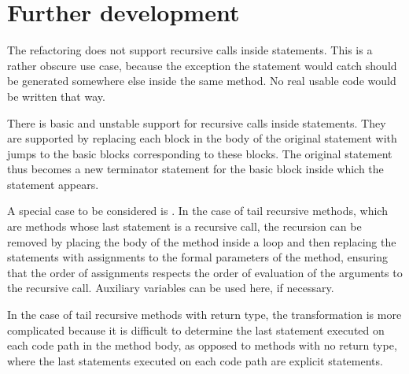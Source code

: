 \chapter{Further development}


The refactoring does not support recursive calls inside  statements. This is a rather obscure use case,
because the exception the  statement would catch should be generated somewhere else inside the same method.
No real usable code would be written that way.

There is basic and unstable support for recursive calls inside  statements. They are supported by
replacing each block in the body of the original  statement with jumps to the basic blocks corresponding
to these blocks. The original  statement thus becomes a new terminator statement for the basic block inside
which the statement appears.

A special case to be considered is . In the case of tail recursive methods, which are methods
whose last statement is a recursive call, the recursion can be removed by placing the body of the method inside a
 loop and then replacing the  statements with assignments to the formal parameters of the
method, ensuring that the order of assignments respects the order of evaluation of the arguments to the recursive call.
Auxiliary variables can be used here, if necessary.

In the case of tail recursive methods with  return type, the transformation is more complicated because it
is difficult to determine the last statement executed on each code path in the method body, as opposed to methods with
no  return type, where the last statements executed on each code path are explicit  statements.